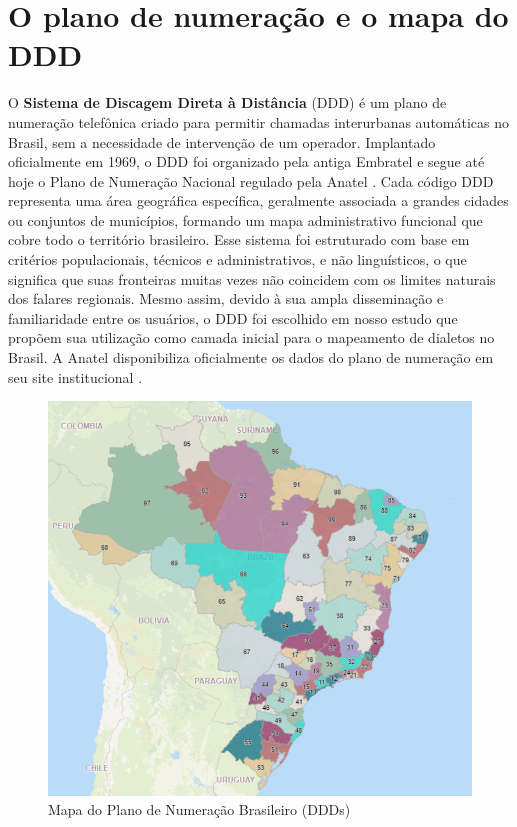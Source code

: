 \section{O plano de numeração e o mapa do DDD}
O \textbf{Sistema de Discagem Direta à Distância} (DDD) é um plano de numeração telefônica criado para permitir chamadas interurbanas automáticas no Brasil, sem a necessidade de intervenção de um operador. Implantado oficialmente em 1969, o DDD foi organizado pela antiga Embratel e segue até hoje o Plano de Numeração Nacional regulado pela Anatel \cite{felipe_embratel_2005}. Cada código DDD representa uma área geográfica específica, geralmente associada a grandes cidades ou conjuntos de municípios, formando um mapa administrativo funcional que cobre todo o território brasileiro. Esse sistema foi estruturado com base em critérios populacionais, técnicos e administrativos, e não linguísticos, o que significa que suas fronteiras muitas vezes não coincidem com os limites naturais dos falares regionais. Mesmo assim, devido à sua ampla disseminação e familiaridade entre os usuários, o DDD foi escolhido em nosso estudo que propõem sua utilização como camada inicial para o mapeamento de dialetos no Brasil. A Anatel disponibiliza oficialmente os dados do plano de numeração em seu site institucional \cite{anatel_pnb}.
\begin{figure}[ht]
  \centering
  \includegraphics[width=\linewidth]{images/mapa_ddd_brasil.png}
  \caption{Mapa do Plano de Numeração Brasileiro (DDDs)}
  \label{fig:mapa-ddd}
\end{figure}

